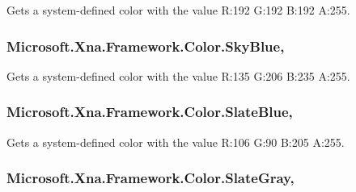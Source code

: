 Gets a system-\/defined color with the value R\+:192 G\+:192 B\+:192 A\+:255.

\hypertarget{struct_microsoft_1_1_xna_1_1_framework_1_1_color_a3a7ce297b713fe8c11bc00c80562bccc}{}
\subsubsection[{Sky\+Blue}]{ Microsoft.\+Xna.\+Framework.\+Color.\+Sky\+Blue\hspace{0.3cm}{\ttfamily [static]}, {\ttfamily [get]}}\label{struct_microsoft_1_1_xna_1_1_framework_1_1_color_a3a7ce297b713fe8c11bc00c80562bccc}


Gets a system-\/defined color with the value R\+:135 G\+:206 B\+:235 A\+:255.

\hypertarget{struct_microsoft_1_1_xna_1_1_framework_1_1_color_aaae7c7f86386d149db4082776120bf44}{}
\subsubsection[{Slate\+Blue}]{ Microsoft.\+Xna.\+Framework.\+Color.\+Slate\+Blue\hspace{0.3cm}{\ttfamily [static]}, {\ttfamily [get]}}\label{struct_microsoft_1_1_xna_1_1_framework_1_1_color_aaae7c7f86386d149db4082776120bf44}


Gets a system-\/defined color with the value R\+:106 G\+:90 B\+:205 A\+:255.

\hypertarget{struct_microsoft_1_1_xna_1_1_framework_1_1_color_a8cf2b439c5dec633c21744030a33976c}{}
\subsubsection[{Slate\+Gray}]{ Microsoft.\+Xna.\+Framework.\+Color.\+Slate\+Gray\hspace{0.3cm}{\ttfamily [static]}, {\ttfamily [get]}}\label{struct_microsoft_1_1_xna_1_1_framework_1_1_color_a8cf2b439c5dec633c21744030a33976c}


